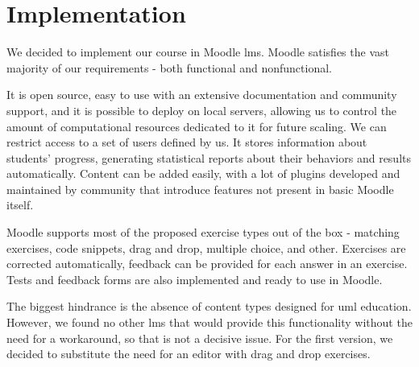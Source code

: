 \chapter{Implementation \label{cha:impl}}

We decided to implement our course in Moodle \ac{lms}. Moodle satisfies the vast majority of our requirements - both functional and nonfunctional. 

It is open source, easy to use with an extensive documentation and community support, and it is possible to deploy on local servers, allowing us to control the amount of computational resources dedicated to it for future scaling. We can restrict access to a set of users defined by us. It stores information about students' progress, generating statistical reports about their behaviors and results automatically. Content can be added easily, with a lot of plugins developed and maintained by community that introduce features not present in basic Moodle itself.

Moodle supports most of the proposed exercise types out of the box - matching exercises, code snippets, drag and drop, multiple choice, and other. Exercises are corrected automatically, feedback can be provided for each answer in an exercise. Tests and feedback forms are also implemented and ready to use in Moodle.

The biggest hindrance is the absence of content types designed for \ac{uml} education. However, we found no other \ac{lms} that would provide this functionality without the need for a workaround, so that is not a decisive issue. For the first version, we decided to substitute the need for an editor with drag and drop exercises.




